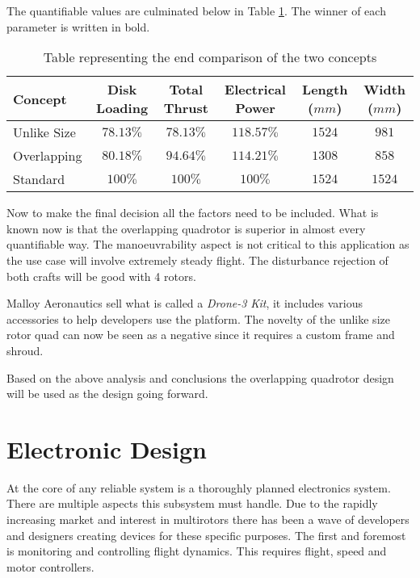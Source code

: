 			The quantifiable values are culminated below in Table \ref{TAB_ConceptComparison}. The winner of each parameter is written in bold.
			
			\begin{table}[H]
				\centering
				\begin{tabular}{l | c | c | c | c | c }
					Concept & Disk Loading & Total Thrust & Electrical Power & Length ($mm$)& Width ($mm$) \\
					\hline\hline
					Unlike Size	  & \boldmath$78.13\%$  & $78.13\%$ 	& $118.57\%$	& $1524$ & $981$ \\
					Overlapping    & $80.18\%$ & \boldmath$94.64\%$  & \boldmath$114.21\%$	& \boldmath$1308$ & \boldmath$858$ \\
					\hline\hline
					Standard		& $100\%$ 	& $100\%$  	  & $100\%$			& $1524$ & $1524$\\
				\end{tabular}
				\label{TAB_ConceptComparison}
				\caption{Table representing the end comparison of the two concepts}
			\end{table}
			
			Now to make the final decision all the factors need to be included. What is known now is that the overlapping quadrotor is superior in almost every quantifiable way. The manoeuvrability aspect is not critical to this application as the use case will involve extremely steady flight. The disturbance rejection of both crafts will be good with 4 rotors. 
			
			Malloy Aeronautics sell what is called a \textit{Drone-3 Kit}, it includes various accessories to help developers use the platform. The novelty of the unlike size rotor quad can now be seen as a negative since it requires a custom frame and shroud.
			
			Based on the above analysis and conclusions the overlapping quadrotor design will be used as the design going forward.

	\section{Electronic Design}
	At the core of any reliable system is a thoroughly planned electronics system. There are multiple aspects this subsystem must handle. Due to the rapidly increasing market and interest in multirotors there has been a wave of developers and designers creating devices for these specific purposes. The first and foremost is monitoring and controlling flight dynamics. This requires flight, speed and motor controllers.	
	
